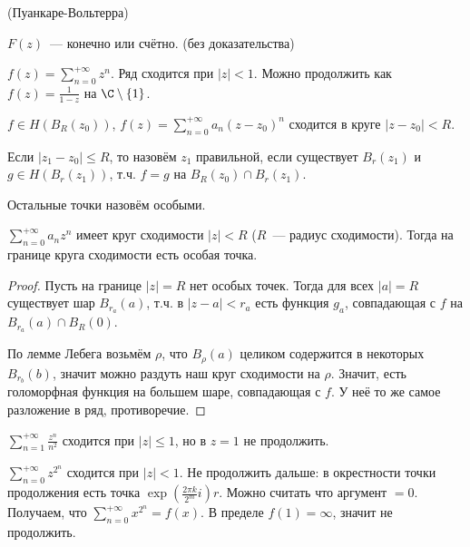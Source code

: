 \begin{theorem}
    (Пуанкаре-Вольтерра)

    $F(z)$~--- конечно или счётно.
    (без доказательства)
\end{theorem}

\begin{example}
    $f(z) = \sum\limits_{n=0}^{+\infty} z^n$.
    Ряд сходится при $|z| < 1$.
    Можно продолжить как $f(z) = \frac{1}{1-z}$
    на $\C \setminus \left\{1\right\}$.
\end{example}

\begin{definition}
    $f \in H(B_R(z_0))$,
    $f(z) = \sum\limits_{n=0}^{+\infty} a_n(z-z_0)^n$
    сходится в круге $|z-z_0| < R$.

    Если $|z_1 -z_0| \le R$, то назовём
    $z_1$ правильной, если существует
    $B_r(z_1)$ и $g \in H(B_r(z_1))$, т.ч.
    $f = g$ на $B_R(z_0) \cap B_r(z_1)$.

    Остальные точки назовём особыми.
\end{definition}

\begin{theorem}
    $\sum\limits_{n=0}^{+\infty} a_nz^n$
    имеет круг сходимости $|z| < R$ ($R$~--- радиус
    сходимости).
    Тогда на границе круга сходимости есть
    особая точка.
\end{theorem}

\begin{proof}
    Пусть на границе $|z| = R$ нет особых точек.
    Тогда для всех $|a| = R$ существует
    шар $B_{r_a}(a)$, т.ч. в $|z-a|<r_a$
    есть функция $g_a$, совпадающая с $f$
    на $B_{r_a}(a) \cap B_R(0)$.

    По лемме Лебега возьмём $\rho$,
    что $B_\rho(a)$ целиком содержится
    в некоторых $B_{r_b}(b)$, значит
    можно раздуть наш круг сходимости на $\rho$.
    Значит, есть голоморфная функция на большем шаре,
    совпадающая с $f$. У неё то же самое разложение
    в ряд, противоречие.
\end{proof}

\begin{example}
    $\sum\limits_{n=1}^{+\infty} \frac{z^n}{n^2}$
    сходится при $|z| \le 1$, но в $z = 1$ не продолжить.
\end{example}

\begin{example}
    $\sum\limits_{n=0}^{+\infty} z^{2^n}$ сходится при $|z| < 1$.
    Не продолжить дальше: в окрестности точки продолжения есть
    точка $\exp\left(\frac{2\pi k}{2^m}i\right)r$.
    Можно считать что аргумент $ = 0$.
    Получаем, что $\sum\limits_{n=0}^{+\infty} x^{2^n} = f(x)$.
    В пределе $f(1) = \infty$, значит не продолжить.
\end{example}

